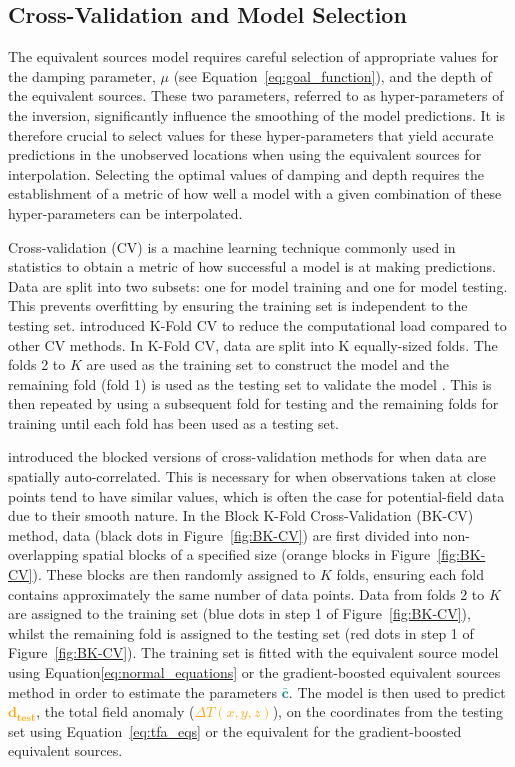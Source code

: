 \subsection{Cross-Validation and Model Selection}

The equivalent sources model requires careful selection of appropriate values for the damping parameter, $\mu$ (see Equation~\ref{eq:goal_function}), and the depth of the equivalent sources. 
These two parameters, referred to as hyper-parameters of the inversion, significantly influence the smoothing of the model predictions. It is therefore crucial to select values for these hyper-parameters that yield accurate predictions in the unobserved locations when using the equivalent sources for interpolation. Selecting the optimal values of damping and depth requires the establishment of a metric of how well a model with a given combination of these hyper-parameters can be interpolated.

Cross-validation (CV) is a machine learning technique commonly used in statistics to obtain a metric of how successful a model is at making predictions. Data are split into two subsets: one for model training and one for model testing. This prevents overfitting by ensuring the training set is independent to the testing set. \citet{Geisser1975} introduced K-Fold CV to reduce the computational load compared to other CV methods. In K-Fold CV, data are split into K equally-sized folds. The folds 2 to $K$ are used as the training set to construct the model and the remaining fold (fold 1) is used as the testing set to validate the model \citep{Jung2017}. This is then repeated by using a subsequent fold for testing and the remaining folds for training until each fold has been used as a testing set.

\citet{Roberts2017} introduced the blocked versions of cross-validation methods for when data are spatially auto-correlated. This is necessary for when observations taken at close points tend to have similar values, which is often the case for potential-field data due to their smooth nature. In the Block K-Fold Cross-Validation (BK-CV) method, data (black dots in Figure~\ref{fig:BK-CV}) are first divided into non-overlapping spatial blocks of a specified size (orange blocks in Figure~\ref{fig:BK-CV}). These blocks are then randomly assigned to $K$ folds, ensuring each fold contains approximately the same number of data points. Data from folds 2 to $K$ are assigned to the training set (blue dots in step 1 of Figure~\ref{fig:BK-CV}), whilst the remaining fold is assigned to the testing set (red dots in step 1 of Figure~\ref{fig:BK-CV}). The training set is fitted with the equivalent source model using Equation\ref{eq:normal_equations} or the gradient-boosted equivalent sources method in order to estimate the parameters \textcolor{teal}{$\bar{\mathbf{c}}$}. The model is then used to predict \textcolor{orange}{$\mathbf{d_{test}}$}, the total field anomaly (\textcolor{orange}{$\Delta T (x, y, z)$}), on the coordinates from the testing set using Equation~\ref{eq:tfa_eqs} or the equivalent for the gradient-boosted equivalent sources.

